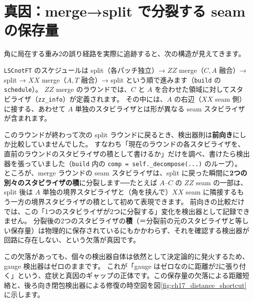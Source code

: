 \section{真因：merge→split で分裂する seam の保存量}\label{sec:rootcause}

角に局在する重み2の誤り経路を実際に追跡すると、次の構造が見えてきます。

\texttt{LSCnotFT} のスケジュールは split（各パッチ独立）→ $ZZ$ merge（$C,A$ 融合）→ split → $XX$ merge（$A,T$ 融合）→ split という順で進みます（\texttt{build} の \texttt{schedule}）。
$ZZ$ merge のラウンドでは、$C$ と $A$ を合わせた領域に対してスタビライザ（\texttt{zz\_info}）が定義されます。
その中には、$A$ の右辺（$XX$ seam 側）に接する、あわせて $A$ 単独のスタビライザとは形が異なる seam スタビライザが含まれます。

このラウンドが終わって次の split ラウンドに戻るとき、検出器則は\textbf{前向き}にしか比較していませんでした。
すなわち「現在のラウンドの各スタビライザを、直前のラウンドのスタビライザの積として書けるか」だけを調べ、書けたら検出器を張っていました（\texttt{build} 内の \texttt{comp = self.\_decompose(...)} のループ）。
ところが、merge ラウンドの seam スタビライザは、split に戻った瞬間に\textbf{2つの別々のスタビライザの積}に分裂します──たとえば $A$–$C$ の $ZZ$ seam の一部は、split 後は $A$ 単独の境界スタビライザと（角を挟んで）$XX$ seam に隣接するもう一方の境界スタビライザの積として初めて表現できます。
前向きの比較だけでは、この「1つのスタビライザが2つに分裂する」変化を検出器として記録できません。
分裂後の2つのスタビライザの\textbf{積}（＝分裂前の元のスタビライザと等しい保存量）は物理的に保存されているにもかかわらず、それを確認する検出器が回路に存在しない、という欠落が真因です。

この欠落があっても、個々の検出器自体は依然として決定論的に発火するため、gauge 検出器はゼロのままです。
これが「gauge はゼロなのに距離が2に張り付く」という、症状と真因のギャップの正体です。この保存量の欠落による距離短絡と、後ろ向き閉包検出器による修復の時空図を図\ref{fig:ch17_distance_shortcut}に示します。

